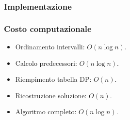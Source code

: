\subsubsection{Implementazione}

\subsubsection{Costo computazionale}
\begin{itemize}
	\item Ordinamento intervalli: $O(n\log n)$.
	\item Calcolo predecessori: $O(n\log n)$.
	\item Riempimento tabella DP: $O(n)$.
	\item Ricostruzione soluzione: $O(n)$.
	\item Algoritmo completo: $O(n\log n)$.
\end{itemize}

